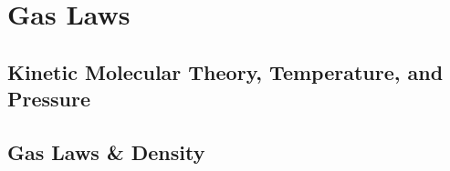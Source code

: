 \documentclass[../hchem.tex]{subfiles}
\begin{document}
\chapter{Gas Laws}
\section{Kinetic Molecular Theory, Temperature, and Pressure}
\section{Gas Laws \& Density}
\end{document}

